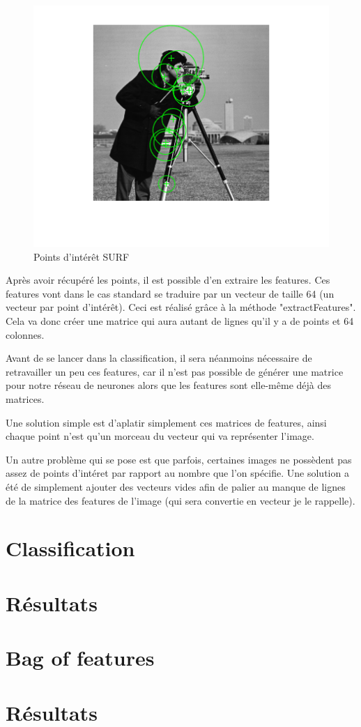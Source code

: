 \begin{figure}[h]
\centering
\includegraphics{pictures/DetectSURFFeaturesExample_01.png}
\caption{Points d'intérêt SURF}
\label{fig:surffeaturesexample}
\end{figure}

Après avoir récupéré les points, il est possible d'en extraire les features. Ces features vont dans le cas standard se traduire par un vecteur de taille 64 (un vecteur par point d'intérêt). Ceci est réalisé grâce à la méthode "extractFeatures". Cela va donc créer une matrice qui aura autant de lignes qu'il y a de points et 64 colonnes.

Avant de se lancer dans la classification, il sera néanmoins nécessaire de retravailler un peu ces features, car il n'est pas possible de générer une matrice pour notre réseau de neurones alors que les features sont elle-même déjà des matrices.

Une solution simple est d'aplatir simplement ces matrices de features, ainsi chaque point n'est qu'un morceau du vecteur qui va représenter l'image.

Un autre problème qui se pose est que parfois, certaines images ne possèdent pas assez de points d'intéret par rapport au nombre que l'on spécifie. Une solution a été de simplement ajouter des vecteurs vides afin de palier au manque de lignes de la matrice des features de l'image (qui sera convertie en vecteur je le rappelle).

\section{Classification}

\section{Résultats}

\section{Bag of features}

\section{Résultats}